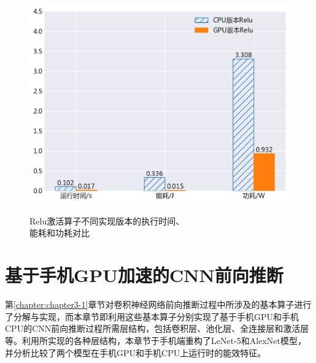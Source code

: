 \begin{figure}[htbp]
\begin{minipage}[b]{.6\linewidth}
    \begin{center}
    \includegraphics[height=0.65\textwidth]{figures/relu_energy.pdf}
    \end{center}
    \caption{Relu激活算子不同实现版本的执行时间、\\ 能耗和功耗对比}\label{figure:figure13}
\end{minipage}
\begin{minipage}[b]{.4\linewidth}
\centering
{}
\label{table:table4}
\end{minipage}
\end{figure}

\section{基于手机GPU加速的CNN前向推断}

第\ref{chapter:chapter3-1}章节对卷积神经网络前向推断过程中所涉及的基本算子进行了分解与实现，而本章节即利用这些基本算子分别实现了基于手机GPU和手机CPU的CNN前向推断过程所需层结构，包括卷积层、池化层、全连接层和激活层等。利用所实现的各种层结构，本章节于手机端重构了LeNet-5和AlexNet模型，并分析比较了两个模型在手机GPU和手机CPU上运行时的能效特征。

